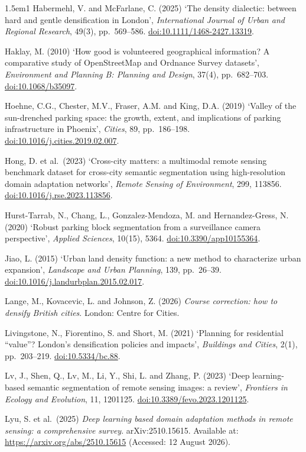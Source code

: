 \begin{hangparas}{1.5em}{1}
Habermehl, V. and McFarlane, C. (2025) `The density dialectic: between hard and gentle densification in London', \emph{International Journal of Urban and Regional Research}, 49(3), pp.~569--586. \url{doi:10.1111/1468-2427.13319}.

Haklay, M. (2010) `How good is volunteered geographical information? A comparative study of OpenStreetMap and Ordnance Survey datasets', \emph{Environment and Planning B: Planning and Design}, 37(4), pp.~682--703. \url{doi:10.1068/b35097}.

Hoehne, C.G., Chester, M.V., Fraser, A.M. and King, D.A. (2019) `Valley of the sun-drenched parking space: the growth, extent, and implications of parking infrastructure in Phoenix', \emph{Cities}, 89, pp.~186--198. \url{doi:10.1016/j.cities.2019.02.007}.

Hong, D. et al.~(2023) `Cross-city matters: a multimodal remote sensing benchmark dataset for cross-city semantic segmentation using high-resolution domain adaptation networks', \emph{Remote Sensing of Environment}, 299, 113856. \url{doi:10.1016/j.rse.2023.113856}.

Hurst-Tarrab, N., Chang, L., Gonzalez-Mendoza, M. and Hernandez-Gress, N. (2020) `Robust parking block segmentation from a surveillance camera perspective', \emph{Applied Sciences}, 10(15), 5364. \url{doi:10.3390/app10155364}.

Jiao, L. (2015) `Urban land density function: a new method to characterize urban expansion', \emph{Landscape and Urban Planning}, 139, pp.~26--39. \url{doi:10.1016/j.landurbplan.2015.02.017}.

Lange, M., Kovacevic, L. and Johnson, Z. (2026) \emph{Course correction: how to densify British cities}. London: Centre for Cities.

Livingstone, N., Fiorentino, S. and Short, M. (2021) `Planning for residential ``value''? London's densification policies and impacts', \emph{Buildings and Cities}, 2(1), pp.~203--219. \url{doi:10.5334/bc.88}.

Lv, J., Shen, Q., Lv, M., Li, Y., Shi, L. and Zhang, P. (2023) `Deep learning-based semantic segmentation of remote sensing images: a review', \emph{Frontiers in Ecology and Evolution}, 11, 1201125. \url{doi:10.3389/fevo.2023.1201125}.

Lyu, S. et al.~(2025) \emph{Deep learning based domain adaptation methods in remote sensing: a comprehensive survey}. arXiv:2510.15615. Available at: \url{https://arxiv.org/abs/2510.15615} (Accessed: 12 August 2026).


\end{hangparas}
